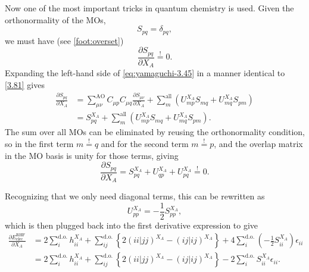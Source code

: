 \documentclass[%
class = book,%
crop = false,%
float = true,%
multi = true,%
preview = false,%
]{standalone}
\begin{document}
Now one of the most important tricks in quantum chemistry is used. Given the orthonormality of the MOs,
\begin{equation}
S_{pq} = \delta_{pq}, \tag{Yamaguchi eq. 3.44}
\end{equation}
we must have (see \autoref{foot:overset})
\begin{equation}
  \label{eq:yamaguchi-3.45}\tag{Yamaguchi eq. 3.45}
  \frac{\partial S_{pq}}{\partial X_{A}} \overset{!}{=} 0.
\end{equation}
Expanding the left-hand side of \eqref{eq:yamaguchi-3.45} in a manner identical to \eqref{3.81} gives
\begin{align*}
\frac{\partial S_{pq}}{\partial X_{A}} &= \sum_{\mu\nu}^{\text{AO}} C_{\mu p} C_{\mu q} \frac{\partial S_{\mu\nu}}{\partial X_{A}} + \sum_{m}^{\text{all}} \left( U_{mp}^{X_{A}} S_{mq} + U_{mq}^{X_{A}} S_{pm} \right) \tag{Yamaguchi eqs. 3.40 + 3.43} \\
                                       &= S_{pq}^{X_{A}} + \sum_{m}^{\text{all}} \left( U_{mp}^{X_{A}} S_{mq} + U_{mq}^{X_{A}} S_{pm} \right). \tag{Yamaguchi eq. 3.43}
\end{align*}
The sum over all MOs can be eliminated by reusing the orthonormality condition, so in the first term \(m \overset{!}{=} q\) and for the second term \(m \overset{!}{=} p\), and the overlap matrix in the MO basis is unity for those terms, giving
\begin{equation}
  \label{eq:yamaguchi-3.46} \tag{Yamaguchi eq. 3.46}
  \frac{\partial S_{pq}}{\partial X_{A}} = S_{pq}^{X_{A}} + U_{qp}^{X_{A}} + U_{pq}^{X_{A}} \overset{!}{=} 0.
\end{equation}

Recognizing that we only need diagonal terms, this can be rewritten as
\begin{equation}
  \label{eq:yamaguchi-4.20} \tag{Yamaguchi eq. 4.20}
  U_{pp}^{X_{A}} = -\frac{1}{2} S_{pp}^{X_{A}},
\end{equation}
which is then plugged back into the first derivative expression to give
\begin{align*}
  \frac{\partial E_{\text{elec}}^{\text{RHF}}}{\partial X_{A}} &= 2 \sum_{i}^{\text{d.o.}} h_{ii}^{X_{A}} + \sum_{ij}^{\text{d.o.}} \left\{ 2(ii|jj)^{X_{A}} - (ij|ij)^{X_{A}} \right\} + 4 \sum_{i}^{\text{d.o.}} \left( -\frac{1}{2} S_{ii}^{X_{A}} \right) \epsilon_{ii} \\
                                                  &= 2 \sum_{i}^{\text{d.o.}} h_{ii}^{X_{A}} + \sum_{ij}^{\text{d.o.}} \left\{ 2(ii|jj)^{X_{A}} - (ij|ij)^{X_{A}} \right\} - 2 \sum_{i}^{\text{d.o.}} S_{ii}^{X_{A}} \epsilon_{ii}. \label{eq:yamaguchi-4.21-rederived}\tag{Yamaguchi eq. 4.21 [rederived]}
\end{align*}
\end{document}
